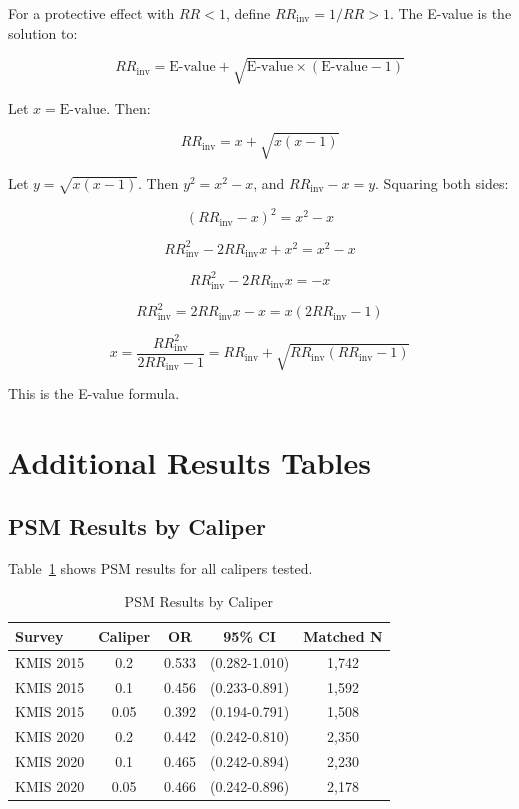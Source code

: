For a protective effect with $RR < 1$, define $RR_{\text{inv}} = 1/RR > 1$. The E-value is the solution to:

\[
RR_{\text{inv}} = \text{E-value} + \sqrt{\text{E-value} \times (\text{E-value} - 1)}
\]

Let $x = \text{E-value}$. Then:

\[
RR_{\text{inv}} = x + \sqrt{x(x-1)}
\]

Let $y = \sqrt{x(x-1)}$. Then $y^2 = x^2 - x$, and $RR_{\text{inv}} - x = y$. Squaring both sides:

\[
(RR_{\text{inv}} - x)^2 = x^2 - x
\]

\[
RR_{\text{inv}}^2 - 2RR_{\text{inv}} x + x^2 = x^2 - x
\]

\[
RR_{\text{inv}}^2 - 2RR_{\text{inv}} x = -x
\]

\[
RR_{\text{inv}}^2 = 2RR_{\text{inv}} x - x = x(2RR_{\text{inv}} - 1)
\]

\[
x = \frac{RR_{\text{inv}}^2}{2RR_{\text{inv}} - 1} = RR_{\text{inv}} + \sqrt{RR_{\text{inv}}(RR_{\text{inv}} - 1)}
\]

This is the E-value formula.

\section{Additional Results Tables}

\subsection{PSM Results by Caliper}

Table~\ref{tab:appendix_psm} shows PSM results for all calipers tested.

\begin{table}[htbp]
	\centering
	\caption{PSM Results by Caliper}
	\label{tab:appendix_psm}
	\begin{tabular}{@{}lcccc@{}}
		\toprule
		\textbf{Survey} & \textbf{Caliper} & \textbf{OR} & \textbf{95\% CI} & \textbf{Matched N} \\
		\midrule
		KMIS 2015 & 0.2 & 0.533 & (0.282-1.010) & 1,742 \\
		KMIS 2015 & 0.1 & 0.456 & (0.233-0.891) & 1,592 \\
		KMIS 2015 & 0.05 & 0.392 & (0.194-0.791) & 1,508 \\
		KMIS 2020 & 0.2 & 0.442 & (0.242-0.810) & 2,350 \\
		KMIS 2020 & 0.1 & 0.465 & (0.242-0.894) & 2,230 \\
		KMIS 2020 & 0.05 & 0.466 & (0.242-0.896) & 2,178 \\
		\bottomrule
	\end{tabular}
\end{table}

